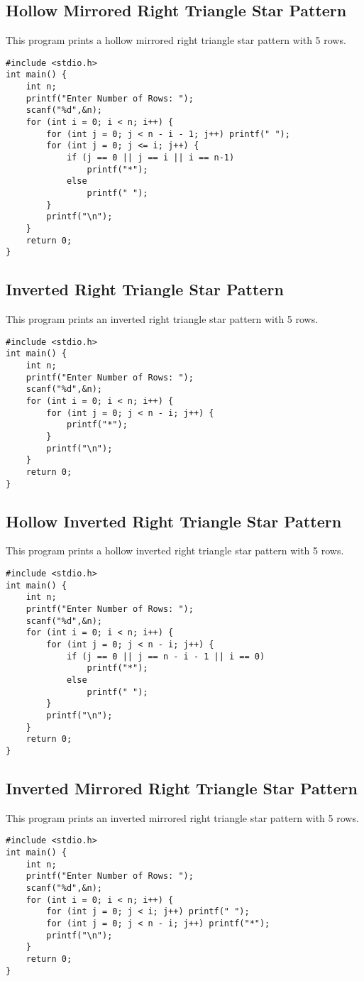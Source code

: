 \documentclass[a4paper,12pt]{article}
\begin{document}
\subsection{Hollow Mirrored Right Triangle Star Pattern}
This program prints a hollow mirrored right triangle star pattern with 5 rows.
\begin{lstlisting}[caption={Hollow Mirrored Right Triangle Star Pattern}]
#include <stdio.h>
int main() {
    int n;
    printf("Enter Number of Rows: ");
    scanf("%d",&n);
    for (int i = 0; i < n; i++) {
        for (int j = 0; j < n - i - 1; j++) printf(" ");
        for (int j = 0; j <= i; j++) {
            if (j == 0 || j == i || i == n-1)
                printf("*");
            else
                printf(" ");
        }
        printf("\n");
    }
    return 0;
}
\end{lstlisting}
\clearpage

\subsection{Inverted Right Triangle Star Pattern}
This program prints an inverted right triangle star pattern with 5 rows.
\begin{lstlisting}[caption={Inverted Right Triangle Star Pattern}]
#include <stdio.h>
int main() {
    int n;
    printf("Enter Number of Rows: ");
    scanf("%d",&n);
    for (int i = 0; i < n; i++) {
        for (int j = 0; j < n - i; j++) {
            printf("*");
        }
        printf("\n");
    }
    return 0;
}
\end{lstlisting}
\clearpage

\subsection{Hollow Inverted Right Triangle Star Pattern}
This program prints a hollow inverted right triangle star pattern with 5 rows.
\begin{lstlisting}[caption={Hollow Inverted Right Triangle Star Pattern}]
#include <stdio.h>
int main() {
    int n;
    printf("Enter Number of Rows: ");
    scanf("%d",&n);
    for (int i = 0; i < n; i++) {
        for (int j = 0; j < n - i; j++) {
            if (j == 0 || j == n - i - 1 || i == 0)
                printf("*");
            else
                printf(" ");
        }
        printf("\n");
    }
    return 0;
}
\end{lstlisting}
\clearpage

\subsection{Inverted Mirrored Right Triangle Star Pattern}
This program prints an inverted mirrored right triangle star pattern with 5 rows.
\begin{lstlisting}[caption={Inverted Mirrored Right Triangle Star Pattern}]
#include <stdio.h>
int main() {
    int n;
    printf("Enter Number of Rows: ");
    scanf("%d",&n);
    for (int i = 0; i < n; i++) {
        for (int j = 0; j < i; j++) printf(" ");
        for (int j = 0; j < n - i; j++) printf("*");
        printf("\n");
    }
    return 0;
}
\end{lstlisting}
\clearpage
\end{document}
